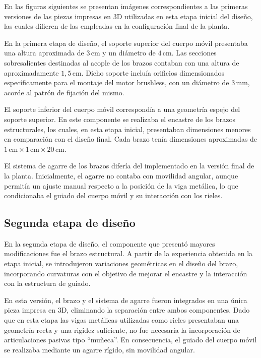 En las figuras siguientes se presentan imágenes correspondientes a las primeras versiones de las piezas impresas en 3D utilizadas en esta etapa inicial del diseño, las cuales difieren de las empleadas en la configuración final de la planta.


En la primera etapa de diseño, el soporte superior del cuerpo móvil presentaba una altura aproximada de \(3\,\text{cm}\) y un diámetro de \(4\,\text{cm}\). Las secciones sobresalientes destinadas al acople de los brazos contaban con una altura de aproximadamente \(1{,}5\,\text{cm}\). Dicho soporte incluía orificios dimensionados específicamente para el montaje del motor brushless, con un diámetro de \(3\,\text{mm}\), acorde al patrón de fijación del mismo.


El soporte inferior del cuerpo móvil correspondía a una geometría espejo del soporte superior. En este componente se realizaba el encastre de los brazos estructurales, los cuales, en esta etapa inicial, presentaban dimensiones menores en comparación con el diseño final. Cada brazo tenía dimensiones aproximadas de \(1\,\text{cm} \times 1\,\text{cm} \times 20\,\text{cm}\).

El sistema de agarre de los brazos difería del implementado en la versión final de la planta. Inicialmente, el agarre no contaba con movilidad angular, aunque permitía un ajuste manual respecto a la posición de la viga metálica, lo que condicionaba el guiado del cuerpo móvil y su interacción con los rieles.

\subsection{Segunda etapa de diseño}

En la segunda etapa de diseño, el componente que presentó mayores modificaciones fue el brazo estructural. A partir de la experiencia obtenida en la etapa inicial, se introdujeron variaciones geométricas en el diseño del brazo, incorporando curvaturas con el objetivo de mejorar el encastre y la interacción con la estructura de guiado.

En esta versión, el brazo y el sistema de agarre fueron integrados en una única pieza impresa en 3D, eliminando la separación entre ambos componentes. Dado que en esta etapa las vigas metálicas utilizadas como rieles presentaban una geometría recta y una rigidez suficiente, no fue necesaria la incorporación de articulaciones pasivas tipo ``muñeca''. En consecuencia, el guiado del cuerpo móvil se realizaba mediante un agarre rígido, sin movilidad angular.

